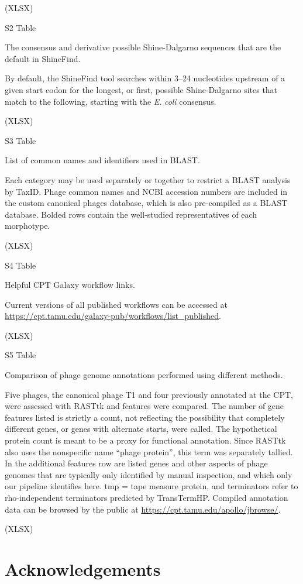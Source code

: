 (XLSX)

S2 Table

The consensus and derivative possible Shine-Dalgarno sequences that are
the default in ShineFind.

By default, the ShineFind tool searches within 3--24 nucleotides
upstream of a given start codon for the longest, or first, possible
Shine-Dalgarno sites that match to the following, starting with the
\emph{E}. \emph{coli} consensus.

(XLSX)

S3 Table

List of common names and identifiers used in BLAST.

Each category may be used separately or together to restrict a BLAST
analysis by TaxID. Phage common names and NCBI accession numbers are
included in the custom canonical phages database, which is also
pre-compiled as a BLAST database. Bolded rows contain the well-studied
representatives of each morphotype.

(XLSX)

S4 Table

Helpful CPT Galaxy workflow links.

Current versions of all published workflows can be accessed at
\url{https://cpt.tamu.edu/galaxy-pub/workflows/list_published}.

(XLSX)

S5 Table

Comparison of phage genome annotations performed using different
methods.

Five phages, the canonical phage T1 and four previously annotated at the
CPT, were assessed with RASTtk and features were compared. The number of
gene features listed is strictly a count, not reflecting the possibility
that completely different genes, or genes with alternate starts, were
called. The hypothetical protein count is meant to be a proxy for
functional annotation. Since RASTtk also uses the nonspecific name
``phage protein'', this term was separately tallied. In the additional
features row are listed genes and other aspects of phage genomes that
are typically only identified by manual inspection, and which only our
pipeline identifies here. tmp = tape measure protein, and terminators
refer to rho-independent terminators predicted by TransTermHP. Compiled
annotation data can be browsed by the public at
\url{https://cpt.tamu.edu/apollo/jbrowse/}.

(XLSX)

\section*{Acknowledgements}

